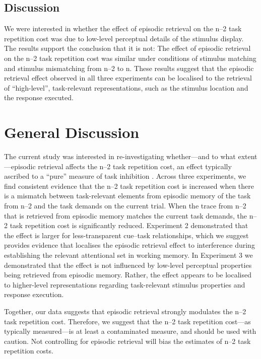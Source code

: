 \documentclass[a4paper, doc, natbib]{apa6}
\begin{document}
\subsection{Discussion}
We were interested in whether the effect of episodic retrieval on the n--2 task repetition cost was due to low-level perceptual details of the stimulus display. The results support the conclusion that it is not: The effect of episodic retrieval on the n--2 task repetition cost was similar under conditions of stimulus matching and stimulus mismatching from n--2 to n. These results suggest that the episodic retrieval effect observed in all three experiments can be localised to the retrieval of ``high-level'', task-relevant representations, such as the stimulus location and the response executed. 

\section{General Discussion}
The current study was interested in re-investigating whether---and to what extent---episodic retrieval affects the n--2 task repetition cost, an effect typically ascribed to a ``pure'' measure of task inhibition \citep{Gade2014, Koch2010, Mayr2007}. Across three experiments, we find consistent evidence that the n--2 task repetition cost is increased when there is a mismatch between task-relevant elements from episodic memory of the task from n--2 and the task demands on the current trial. When the trace from n--2 that is retrieved from episodic memory matches the current task demands, the n--2 task repetition cost is significantly reduced. Experiment 2 demonstrated that the effect is larger for less-transparent cue--task relationships, which we suggest provides evidence that localises the episodic retrieval effect to interference during establishing the relevant attentional set in working memory. In Experiment 3 we demonstrated that the effect is not influenced by low-level perceptual properties being retrieved from episodic memory. Rather, the effect appears to be localised to higher-level representations regarding task-relevant stimulus properties and response execution. 

Together, our data suggests that episodic retrieval strongly modulates the n--2 task repetition cost. Therefore, we suggest that the n--2 task repetition cost---as typically measured---is at least a contaminated measure, and should be used with caution. Not controlling for episodic retrieval will bias the estimates of n--2 task repetition costs. 
\end{document}
